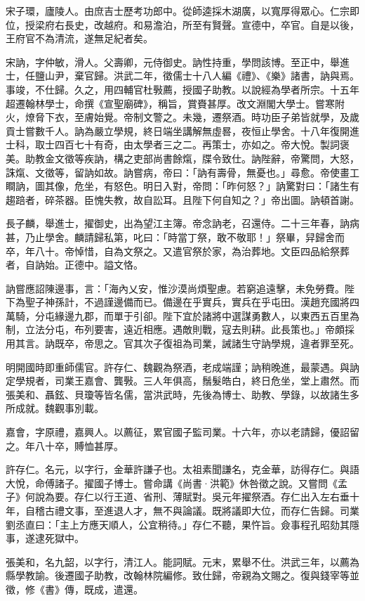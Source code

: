 \begin{pinyinscope}
宋子環，廬陵人。由庶吉士歷考功郎中。從師逵採木湖廣，以寬厚得眾心。仁宗即位，授梁府右長史，改越府。和易澹泊，所至有賢聲。宣德中，卒官。自是以後，王府官不為清流，遂無足紀者矣。

宋訥，字仲敏，滑人。父壽卿，元侍御史。訥性持重，學問該博。至正中，舉進士，任鹽山尹，棄官歸。洪武二年，徵儒士十八人編《禮》、《樂》諸書，訥與焉。事竣，不仕歸。久之，用四輔官杜斅薦，授國子助教。以說經為學者所宗。十五年超遷翰林學士，命撰《宣聖廟碑》，稱旨，賞賚甚厚。改文淵閣大學士。嘗寒附火，燎脅下衣，至膚始覺。帝制文警之。未幾，遷祭酒。時功臣子弟皆就學，及歲貢士嘗數千人。訥為嚴立學規，終日端坐講解無虛晷，夜恒止學舍。十八年復開進士科，取士四百七十有奇，由太學者三之二。再策士，亦如之。帝大悅。製詞褒美。助教金文徵等疾訥，構之吏部尚書餘熂，牒令致仕。訥陛辭，帝驚問，大怒，誅熂、文徵等，留訥如故。訥嘗病，帝曰：「訥有壽骨，無憂也。」尋愈。帝使畫工瞷訥，圖其像，危坐，有怒色。明日入對，帝問：「昨何怒？」訥驚對曰：「諸生有趨踣者，碎茶器。臣愧失教，故自訟耳。且陛下何自知之？」帝出圖。訥頓首謝。

長子麟，舉進士，擢御史，出為望江主簿。帝念訥老，召還侍。二十三年春，訥病甚，乃止學舍。麟請歸私第，叱曰：「時當丁祭，敢不敬耶！」祭畢，舁歸舍而卒，年八十。帝悼惜，自為文祭之。又遣官祭於家，為治葬地。文臣四品給祭葬者，自訥始。正德中。謚文恪。

訥嘗應詔陳邊事，言：「海內乂安，惟沙漠尚煩聖慮。若窮追遠擊，未免勞費。陛下為聖子神孫計，不過謹邊備而已。備邊在乎實兵，實兵在乎屯田。漢趙充國將四萬騎，分屯緣邊九郡，而單于引卻。陛下宜於諸將中選謀勇數人，以東西五百里為制，立法分屯，布列要害，遠近相應。遇敵則戰，寇去則耕。此長策也。」帝頗採用其言。訥既卒，帝思之。官其次子復祖為司業，誡諸生守訥學規，違者罪至死。

明開國時即重師儒官。許存仁、魏觀為祭酒，老成端謹；訥稍晚進，最蒙遇。與訥定學規者，司業王嘉會、龔斅。三人年俱高，鬚髮皓白，終日危坐，堂上肅然。而張美和、聶鉉、貝瓊等皆名儒，當洪武時，先後為博士、助教、學錄，以故諸生多所成就。魏觀事別載。

嘉會，字原禮，嘉興人。以薦征，累官國子監司業。十六年，亦以老請歸，優詔留之。年八十卒，賻恤甚厚。

許存仁。名元，以字行，金華許謙子也。太祖素聞謙名，克金華，訪得存仁。與語大悅，命傅諸子。擢國子博士。嘗命講《尚書·洪範》休咎徵之說。又嘗問《孟子》何說為要。存仁以行王道、省刑、薄賦對。吳元年擢祭酒。存仁出入左右垂十年，自稽古禮文事，至進退人才，無不與論議。既將議即大位，而存仁告歸。司業劉丞直曰：「主上方應天順人，公宜稍待。」存仁不聽，果忤旨。僉事程孔昭劾其隱事，遂逮死獄中。

張美和，名九韶，以字行，清江人。能詞賦。元末，累舉不仕。洪武三年，以薦為縣學教諭。後遷國子助教，改翰林院編修。致仕歸，帝親為文賜之。復與錢宰等並徵，修《書》傳，既成，遣還。


\end{pinyinscope}
